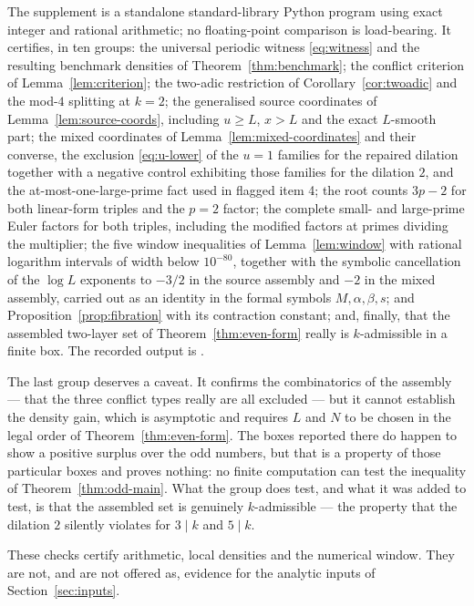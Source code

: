\documentclass[11pt]{article}
\begin{document}
The supplement  is a standalone
standard-library Python program using exact integer and rational arithmetic;
no floating-point comparison is load-bearing. It certifies, in ten groups:
the universal periodic witness \eqref{eq:witness} and the resulting benchmark
densities of Theorem~\ref{thm:benchmark}; the conflict criterion of
Lemma~\ref{lem:criterion}; the two-adic restriction of Corollary~\ref{cor:twoadic} and the
mod-\(4\) splitting at \(k=2\); the generalised source coordinates of
Lemma~\ref{lem:source-coords}, including \(u\geq L\), \(x>L\) and the exact
\(L\)-smooth part; the mixed coordinates of Lemma~\ref{lem:mixed-coordinates} and
their converse, the exclusion \eqref{eq:u-lower} of the \(u=1\) families for
the repaired dilation together with a negative control exhibiting those
families for the dilation \(2\), and the at-most-one-large-prime fact used in
flagged item 4; the root counts \(3p-2\) for both linear-form triples and the
\(p=2\) factor; the complete small- and large-prime Euler factors for both
triples, including the modified factors at primes dividing the multiplier;
the five window inequalities of Lemma~\ref{lem:window} with rational logarithm
intervals of width below \(10^{-80}\), together with the symbolic
cancellation of the \(\log L\) exponents to \(-3/2\) in the source assembly
and \(-2\) in the mixed assembly, carried out as an identity in the formal
symbols \(M,\alpha,\beta,s\); and Proposition~\ref{prop:fibration} with its contraction
constant; and, finally, that the assembled two-layer set of
Theorem~\ref{thm:even-form} really is \(k\)-admissible in a finite box. The
recorded output is .

The last group deserves a caveat. It confirms the combinatorics of the
assembly --- that the three conflict types really are all excluded --- but it
cannot establish the density gain, which is asymptotic and requires \(L\) and
\(N\) to be chosen in the legal order of Theorem~\ref{thm:even-form}. The
boxes reported there do happen to show a positive surplus over the odd
numbers, but that is a property of those particular boxes and proves nothing:
no finite computation can test the inequality of
Theorem~\ref{thm:odd-main}. What the group does test, and what it was added
to test, is that the assembled set is genuinely \(k\)-admissible --- the
property that the dilation \(2\) silently violates for \(3\mid k\) and
\(5\mid k\).

These checks certify arithmetic, local densities and the numerical window.
They are not, and are not offered as, evidence for the analytic inputs of
Section~\ref{sec:inputs}.
\end{document}
